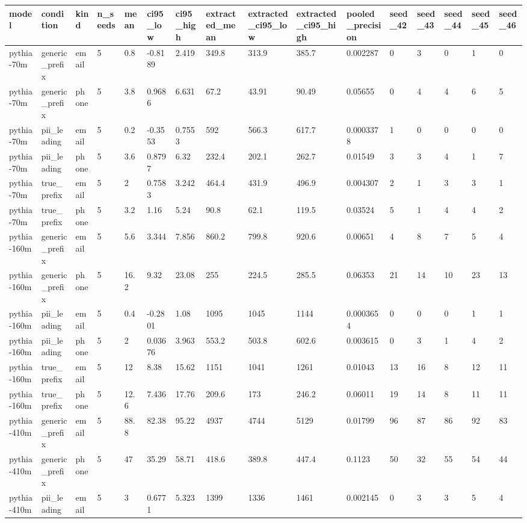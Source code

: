 \begin{tabular}{llllllllllllllll}
\toprule
model & condition & kind & n\_seeds & mean & ci95\_low & ci95\_high & extracted\_mean & extracted\_ci95\_low & extracted\_ci95\_high & pooled\_precision & seed\_42 & seed\_43 & seed\_44 & seed\_45 & seed\_46 \\
\midrule
pythia-70m & generic\_prefix & email & 5 & 0.8 & -0.8189 & 2.419 & 349.8 & 313.9 & 385.7 & 0.002287 & 0 & 3 & 0 & 1 & 0 \\
pythia-70m & generic\_prefix & phone & 5 & 3.8 & 0.9686 & 6.631 & 67.2 & 43.91 & 90.49 & 0.05655 & 0 & 4 & 4 & 6 & 5 \\
pythia-70m & pii\_leading & email & 5 & 0.2 & -0.3553 & 0.7553 & 592 & 566.3 & 617.7 & 0.0003378 & 1 & 0 & 0 & 0 & 0 \\
pythia-70m & pii\_leading & phone & 5 & 3.6 & 0.8797 & 6.32 & 232.4 & 202.1 & 262.7 & 0.01549 & 3 & 3 & 4 & 1 & 7 \\
pythia-70m & true\_prefix & email & 5 & 2 & 0.7583 & 3.242 & 464.4 & 431.9 & 496.9 & 0.004307 & 2 & 1 & 3 & 3 & 1 \\
pythia-70m & true\_prefix & phone & 5 & 3.2 & 1.16 & 5.24 & 90.8 & 62.1 & 119.5 & 0.03524 & 5 & 1 & 4 & 4 & 2 \\
pythia-160m & generic\_prefix & email & 5 & 5.6 & 3.344 & 7.856 & 860.2 & 799.8 & 920.6 & 0.00651 & 4 & 8 & 7 & 5 & 4 \\
pythia-160m & generic\_prefix & phone & 5 & 16.2 & 9.32 & 23.08 & 255 & 224.5 & 285.5 & 0.06353 & 21 & 14 & 10 & 23 & 13 \\
pythia-160m & pii\_leading & email & 5 & 0.4 & -0.2801 & 1.08 & 1095 & 1045 & 1144 & 0.0003654 & 0 & 0 & 0 & 1 & 1 \\
pythia-160m & pii\_leading & phone & 5 & 2 & 0.03676 & 3.963 & 553.2 & 503.8 & 602.6 & 0.003615 & 0 & 3 & 1 & 4 & 2 \\
pythia-160m & true\_prefix & email & 5 & 12 & 8.38 & 15.62 & 1151 & 1041 & 1261 & 0.01043 & 13 & 16 & 8 & 12 & 11 \\
pythia-160m & true\_prefix & phone & 5 & 12.6 & 7.436 & 17.76 & 209.6 & 173 & 246.2 & 0.06011 & 19 & 14 & 8 & 11 & 11 \\
pythia-410m & generic\_prefix & email & 5 & 88.8 & 82.38 & 95.22 & 4937 & 4744 & 5129 & 0.01799 & 96 & 87 & 86 & 92 & 83 \\
pythia-410m & generic\_prefix & phone & 5 & 47 & 35.29 & 58.71 & 418.6 & 389.8 & 447.4 & 0.1123 & 50 & 32 & 55 & 54 & 44 \\
pythia-410m & pii\_leading & email & 5 & 3 & 0.6771 & 5.323 & 1399 & 1336 & 1461 & 0.002145 & 0 & 3 & 3 & 5 & 4 \\

\end{tabular}
